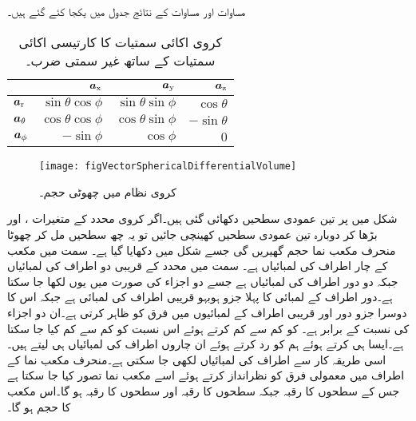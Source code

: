 مساوات   اور مساوات   کے نتائج جدول  میں یکجا کئے گئے ہیں۔
\begin{table}
\caption{کروی  اکائی سمتیات کا کارتیسی اکائی سمتیات کے ساتھ غیر سمتی ضرب۔}
\centering
\begin{tabular}{l | r r r}
 & ${\boldsymbol{a}}_{\textup{x}}$ & ${\boldsymbol{a}}_{\textup{y}}$ & ${\boldsymbol{a}}_{\textup{z}}$ \\
\hline
${\boldsymbol{a}}_{\textup{r}}$ & $\sin \theta \cos \phi$ & $\sin \theta \sin \phi$& $\cos \theta$\\
${\boldsymbol{a}}_{\theta}$ &$\cos \theta \cos \phi$ &$ \cos \theta \sin \phi$ &$ -\sin \theta$\\
${\boldsymbol{a}}_{\phi}$ & $-\sin \phi$ &$ \cos \phi$ &$0$
\end{tabular}
\label{جدول_سمتیہ_کروی_کارتیسی_اکائی_غیر-سمتی_ضرب}
\end{table}
%
\begin{figure}
\centering
\texttt{[image: figVectorSphericalDifferentialVolume]}
\caption{کروی نظام میں چھوٹی حجم۔}
\label{شکل_سمتیہ_کروی_چھوٹی_حجم}
\end{figure}

شکل  میں  پر تین عمودی سطحیں دکھائی گئی ہیں۔اگر کروی محدد کے متغیرات ،  اور  بڑھا کر دوبارہ تین عمودی سطحیں کھینچی جائیں تو یہ چھ سطحیں مل کر چھوٹا منحرف مکعب نما حجم گھیریں گی جسے شکل  میں دکھایا گیا ہے۔ سمت میں مکعب کے چار اطراف کی لمبائیاں  ہے۔ سمت میں  محدد کے قریبی دو اطراف کی لمبائیاں  جبکہ دو دور اطراف کی لمبائیاں  ہے جسے دو اجزاء کی صورت میں یوں   لکھا جا سکتا ہے۔دور اطراف کے لمبائی کا پہلا جزو ہوبہو قریبی اطراف کی لمبائی ہے جبکہ اس کا دوسرا جزو دور اور قریبی اطراف کے لمبائیوں میں فرق کو ظاہر کرتی ہے۔ان دو اجزاء کی نسبت   کے برابر ہے۔ کو کم سے کم کرتے ہوئے اس نسبت کو کم سے کم کیا جا سکتا  ہے۔ایسا ہی کرتے ہوئے ہم  کو رد کرتے ہوئے ان چاروں اطراف کی لمبائیاں  ہی لیتے ہیں۔اسی طریقہ کار سے   اطراف کی لمبائیاں   لکھی جا سکتی ہے۔منحرف مکعب نما کے اطراف میں معمولی فرق کو نظرانداز کرتے ہوئے اسے مکعب نما تصور کیا جا سکتا ہے جس کے  سطحوں کا رقبہ  جبکہ  سطحوں کا رقبہ  اور  سطحوں کا رقبہ    ہو گا۔اس مکعب کا حجم  ہو گا۔

